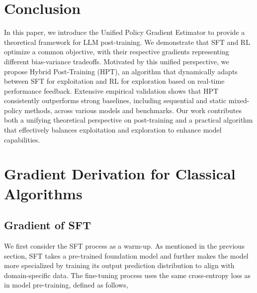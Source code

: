 \documentclass{article} %
\newcommand{\0}{\mathbb{0}}
\newcommand{\1}{\mathbb{1}}
\begin{document}




\section{Conclusion}

In this paper, we introduce the Unified Policy Gradient Estimator to provide a theoretical framework for LLM post-training. We demonstrate that SFT and RL optimize a common objective, with their respective gradients representing different bias-variance tradeoffs. Motivated by this unified perspective, we propose Hybrid Post-Training (HPT), an algorithm that dynamically adapts between SFT for exploitation and RL for exploration based on real-time performance feedback. Extensive empirical validation shows that HPT consistently outperforms strong baselines, including sequential and static mixed-policy methods, across various models and benchmarks. Our work contributes both a unifying theoretical perspective on post-training and a practical algorithm that effectively balances exploitation and exploration to enhance model capabilities.












\newpage
\appendix



\section{Gradient Derivation for Classical Algorithms} \label{sec:appdendix_grad_cal}
\subsection{Gradient of SFT}

We first consider the SFT process as a warm-up. 
As mentioned in the previous section, SFT takes a pre-trained foundation model and further makes the model more specialized by training its output prediction distribution to align with domain-specific data. 
The fine-tuning process uses the same cross-entropy loss as in model pre-training, defined as follows,
\end{document}

